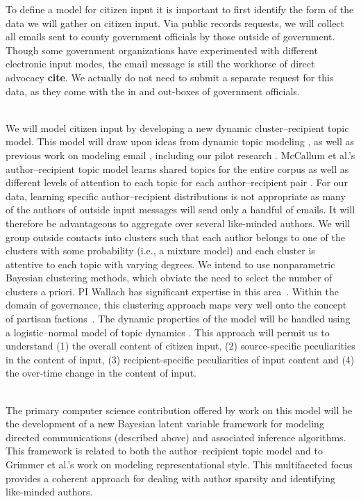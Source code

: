  To define a model for citizen input it is important to first identify the form of the data we will gather on citizen input. Via public records requests, we will collect all emails sent to county government officials by those outside of government. Though some government organizations have experimented with different electronic input modes, the email message is still the workhorse of direct advocacy {\bf cite}. We actually do not need to submit a separate request for this data, as they come with the in and out-boxes of government officials.

~\\
 We will model citizen input by
developing a new dynamic cluster--recipient topic model. This model
will draw upon ideas from dynamic topic modeling \cite{Blei2006}, as
well as previous work on modeling email \cite{McCallum2005}, including
our pilot research \cite{Krafft2012}. McCallum et al.'s
author--recipient topic model learns shared topics for the entire
corpus as well as different levels of attention to each topic for each
author--recipient pair \cite{McCallum2005}. For our data, learning
specific author--recipient distributions is not appropriate as many of
the authors of outside input messages will send only a handful of
emails. It will therefore be advantageous to aggregate over several
like-minded authors. We will group outside contacts into clusters such
that each author belongs to one of the clusters with some probability
(i.e., a mixture model) and each cluster is attentive to each topic
with varying degrees. We intend to use nonparametric Bayesian
clustering methods, which obviate the need to select the number of
clusters a priori. PI Wallach has significant expertise in this
area~\cite{Wallach2008,Wallach2010}. Within the domain of governance,
this clustering approach maps very well onto the concept of partisan
factions~\cite{}. The dynamic properties of the model will be handled using a
logistic--normal model of topic dynamics \cite{Blei2006}. This
approach will permit us to understand (1) the overall content of
citizen input, (2) source-specific peculiarities in the content of
input, (3) recipient-specific peculiarities of input content and (4)
the over-time change in the content of input.

~\\
 The primary computer
science contribution offered by work on this model will be the
development of a new Bayesian latent variable framework for modeling
directed communications (described above) and associated inference
algorithms. This framework is related to both the author--recipient
topic model and to Grimmer et al.'s work on modeling representational
style. This multifaceted focus provides a coherent approach for
dealing with author sparsity and identifying like-minded authors.

